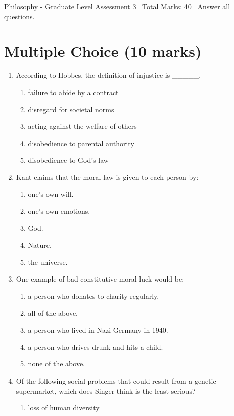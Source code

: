 \documentclass[12pt]{article}
\begin{document}
\begin{center}
Philosophy - Graduate Level Assessment 3 \
Total Marks: 40 \
Answer all questions.
\end{center}

\section*{Multiple Choice (10 marks)}
\begin{enumerate}[label=\arabic*.]
\item According to Hobbes, the definition of injustice is \_\_\_\_\_.
\begin{enumerate}[label=(\alph*)]
    \item failure to abide by a contract
    \item disregard for societal norms
    \item acting against the welfare of others
    \item disobedience to parental authority
    \item disobedience to God's law
\end{enumerate}
\item Kant claims that the moral law is given to each person by:
\begin{enumerate}[label=(\alph*)]
    \item one's own will.
    \item one's own emotions.
    \item God.
    \item Nature.
    \item the universe.
\end{enumerate}
\item One example of bad constitutive moral luck would be:
\begin{enumerate}[label=(\alph*)]
    \item a person who donates to charity regularly.
    \item all of the above.
    \item a person who lived in Nazi Germany in 1940.
    \item a person who drives drunk and hits a child.
    \item none of the above.
\end{enumerate}
\item Of the following social problems that could result from a genetic supermarket, which does Singer think is the least serious?
\begin{enumerate}[label=(\alph*)]
    \item loss of human diversity

\end{enumerate}
\end{enumerate}
\end{document}
